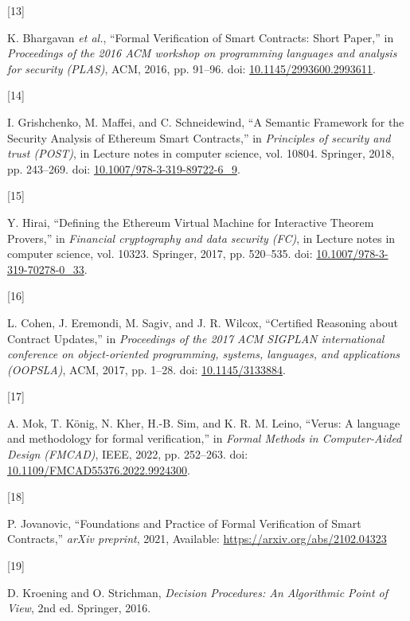 \documentclass[
  english,
  onecolumn]{article}
\newlength{\cslhangindent}
\newlength{\csllabelwidth}
\newenvironment{CSLReferences}[2] %
 {\begin{list}{}{%
  \setlength{\itemindent}{0pt}
  \setlength{\leftmargin}{0pt}
  \setlength{\parsep}{0pt}
  \ifodd #1
   \setlength{\leftmargin}{\cslhangindent}
   \setlength{\itemindent}{-1\cslhangindent}
  \fi
  \setlength{\itemsep}{#2\baselineskip}}}
 {\end{list}}
\newcommand{\CSLLeftMargin}[1]{\parbox[t]{\csllabelwidth}{\strut#1\strut}}
\newcommand{\CSLRightInline}[1]{\parbox[t]{\linewidth - \csllabelwidth}{\strut#1\strut}}
\begin{document}
\begin{CSLReferences}{0}{0}
\CSLLeftMargin{{[}13{]} }%
\CSLRightInline{K. Bhargavan \emph{et al.}, {``{Formal Verification of
Smart Contracts: Short Paper},''} in \emph{Proceedings of the 2016 ACM
workshop on programming languages and analysis for security (PLAS)},
ACM, 2016, pp. 91--96. doi:
\href{https://doi.org/10.1145/2993600.2993611}{10.1145/2993600.2993611}.}

\CSLLeftMargin{{[}14{]} }%
\CSLRightInline{I. Grishchenko, M. Maffei, and C. Schneidewind, {``{A
Semantic Framework for the Security Analysis of Ethereum Smart
Contracts},''} in \emph{Principles of security and trust (POST)}, in
Lecture notes in computer science, vol. 10804. Springer, 2018, pp.
243--269. doi:
\href{https://doi.org/10.1007/978-3-319-89722-6_9}{10.1007/978-3-319-89722-6\_9}.}

\CSLLeftMargin{{[}15{]} }%
\CSLRightInline{Y. Hirai, {``{Defining the Ethereum Virtual Machine for
Interactive Theorem Provers},''} in \emph{Financial cryptography and
data security (FC)}, in Lecture notes in computer science, vol. 10323.
Springer, 2017, pp. 520--535. doi:
\href{https://doi.org/10.1007/978-3-319-70278-0_33}{10.1007/978-3-319-70278-0\_33}.}

\CSLLeftMargin{{[}16{]} }%
\CSLRightInline{L. Cohen, J. Eremondi, M. Sagiv, and J. R. Wilcox,
{``{Certified Reasoning about Contract Updates},''} in \emph{Proceedings
of the 2017 ACM SIGPLAN international conference on object-oriented
programming, systems, languages, and applications (OOPSLA)}, ACM, 2017,
pp. 1--28. doi:
\href{https://doi.org/10.1145/3133884}{10.1145/3133884}.}

\CSLLeftMargin{{[}17{]} }%
\CSLRightInline{A. Mok, T. König, N. Kher, H.-B. Sim, and K. R. M.
Leino, {``{Verus: A language and methodology for formal
verification},''} in \emph{{Formal Methods in Computer-Aided Design
(FMCAD)}}, IEEE, 2022, pp. 252--263. doi:
\href{https://doi.org/10.1109/FMCAD55376.2022.9924300}{10.1109/FMCAD55376.2022.9924300}.}

\CSLLeftMargin{{[}18{]} }%
\CSLRightInline{P. Jovanovic, {``{Foundations and Practice of Formal
Verification of Smart Contracts},''} \emph{arXiv preprint}, 2021,
Available: \url{https://arxiv.org/abs/2102.04323}}

\CSLLeftMargin{{[}19{]} }%
\CSLRightInline{D. Kroening and O. Strichman, \emph{{Decision
Procedures: An Algorithmic Point of View}}, 2nd ed. Springer, 2016.}


\end{CSLReferences}
\end{document}
